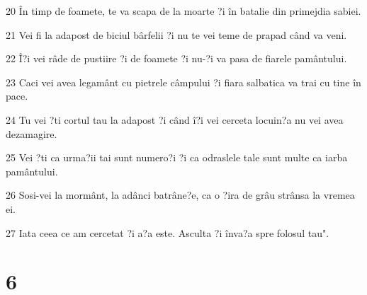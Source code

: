 \par 20 În timp de foamete, te va scapa de la moarte ?i în batalie din primejdia sabiei.
\par 21 Vei fi la adapost de biciul bârfelii ?i nu te vei teme de prapad când va veni.
\par 22 Î?i vei râde de pustiire ?i de foamete ?i nu-?i va pasa de fiarele pamântului.
\par 23 Caci vei avea legamânt cu pietrele câmpului ?i fiara salbatica va trai cu tine în pace.
\par 24 Tu vei ?ti cortul tau la adapost ?i când î?i vei cerceta locuin?a nu vei avea dezamagire.
\par 25 Vei ?ti ca urma?ii tai sunt numero?i ?i ca odraslele tale sunt multe ca iarba pamântului.
\par 26 Sosi-vei la mormânt, la adânci batrâne?e, ca o ?ira de grâu strânsa la vremea ei.
\par 27 Iata ceea ce am cercetat ?i a?a este. Asculta ?i înva?a spre folosul tau".

\chapter{6}

